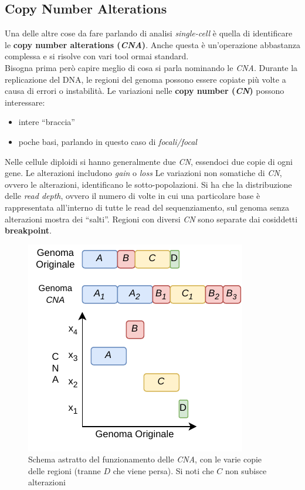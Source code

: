 \documentclass[a4paper,12pt, oneside]{book}
\begin{document}
\subsection{Copy Number Alterations}
Una delle altre cose da fare parlando di analisi \textit{single-cell} è quella
di identificare le \textbf{copy number alterations (\textit{CNA})}. Anche questa
è un'operazione abbastanza complessa e si risolve con vari tool ormai
standard.\\
Bisogna prima però capire meglio di cosa si parla nominando le \textit{CNA}.
Durante la replicazione del DNA, le regioni del genoma possono essere copiate
più volte a causa di errori o instabilità. Le variazioni nelle \textbf{copy
  number (\textit{CN})} possono interessare:
\begin{itemize}
  \item intere ``braccia''
  \item poche basi, parlando in questo caso di \textit{focali/focal}
\end{itemize}
Nelle cellule diploidi si hanno generalmente due \textit{CN}, essendoci due
copie di ogni gene.  Le alterazioni
includono \textit{gain} o \textit{loss} Le variazioni non somatiche di
\textit{CN}, ovvero le alterazioni, identificano le sotto-popolazioni. Si ha che
la distribuzione delle \textit{read depth}, ovvero il numero di volte in cui una
particolare base è rappresentata all'interno di tutte le read del
sequenziamento, sul genoma senza alterazioni mostra dei ``salti''. Regioni
con diversi \textit{CN} sono separate dai cosiddetti \textbf{breakpoint}.
\begin{figure}
  \centering
  \includegraphics[scale = 1.1]{img/cna.pdf}
  \caption{Schema astratto del funzionamento delle \textit{CNA}, con le varie
    copie delle regioni (tranne $D$ che viene persa). Si noti che $C$ non
    subisce alterazioni}
  \label{fig:cna}
\end{figure}
\end{document}
